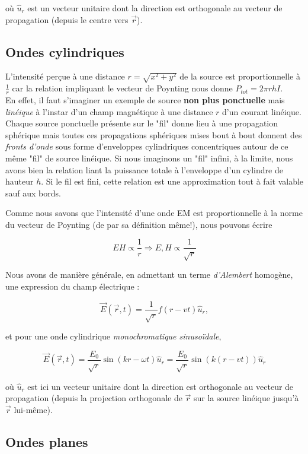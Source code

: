 où $\hat{u}_{r}$ est un vecteur unitaire dont la direction est orthogonale au vecteur de propagation (depuis le centre vers $\vec{r}$).


\subsection{Ondes cylindriques} 

L'intensité perçue à une distance $r = \sqrt{x^{2} + y^{2}}$ de la source est proportionnelle à $\frac{1}{r}$ car la relation impliquant le vecteur de Poynting nous 
donne $P_{tot} = 2 \pi r h I$. \\ En effet, il faut s'imaginer un exemple de source \textbf{non plus ponctuelle} mais \textit{linéique} à l'instar d'un champ magnétique à une 
distance $r$ d'un courant linéique. Chaque source ponctuelle présente sur le "fil" donne lieu à une propagation sphérique mais toutes ces propagations sphériques mises bout à bout donnent 
des \textit{fronts d'onde} sous forme d'enveloppes cylindriques concentriques autour de ce même "fil" de source linéique. Si nous imaginons un "fil" infini, à la limite,
nous avons bien la relation liant la puissance totale à l'enveloppe d'un cylindre de hauteur $h$. Si le fil est fini, cette relation est une approximation tout à fait valable sauf 
aux bords.

Comme nous savons que l'intensité d'une onde EM est proportionnelle à la norme du vecteur de Poynting (de par sa définition même!), nous pouvons écrire 

\[ EH \propto \frac{1}{r} \Rightarrow E,H \propto \frac{1}{\sqrt{r}}\]

Nous avons de manière générale, en admettant un terme \textit{d'Alembert} homogène, une expression du champ électrique : 

\[\vec{E}(\vec{r},t) = \frac{1}{\sqrt{r}} f(r-vt) \hat{u}_{r},\] 

et pour une onde cylindrique \textit{monochromatique sinusoïdale},

\[\vec{E}(\vec{r},t) = \frac{E_{0}}{\sqrt{r}} \sin(kr - \omega t) \hat{u}_{r} = \frac{E_{0}}{\sqrt{r}} \sin(k(r - v t)) \hat{u}_{r}\]

où $\hat{u}_{r}$ est ici un vecteur unitaire dont la direction est orthogonale au vecteur de propagation (depuis la projection orthogonale de $\vec{r}$ sur la source linéique jusqu'à $\vec{r}$ lui-même).


\subsection{Ondes planes} 

